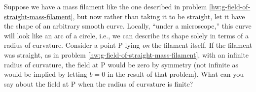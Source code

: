 Suppose we have a mass filament like the one described in problem
\ref{hw:g-field-of-straight-mass-filament}, but now rather than taking it to be
straight, let it have the shape of an arbitrary smooth curve. Locally, ``under a
microscope,'' this curve will look like an arc of a circle, i.e., we can describe its
shape solely in terms of a radius of curvature. 
Consider a point P lying \emph{on} the filament itself. If the filament was straight,
as in problem \ref{hw:g-field-of-straight-mass-filament}, with an infinite radius of
curvature, the field at P
would be zero by symmetry (not infinite as would be implied by letting $b=0$ in the
result of that problem). What can you say about the field at P when the radius of
curvature is finite?
